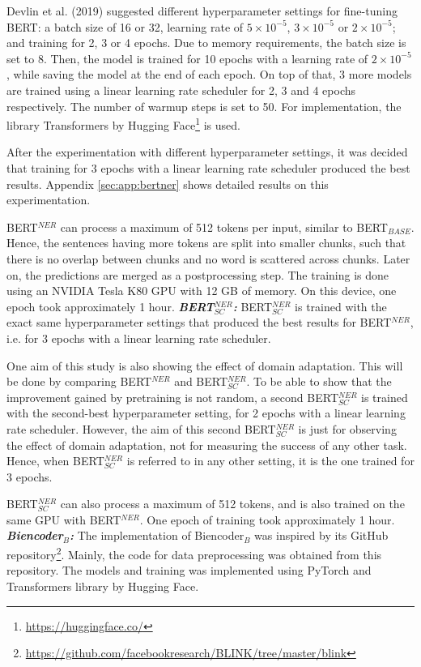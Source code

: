 \documentclass{report}
\theoremstyle{definition}
\theoremstyle{remark}
\begin{document}
Devlin et al. (2019) \cite{BERT} suggested different hyperparameter settings for fine-tuning BERT: a batch size of 16 or 32, learning rate of $5\times10^{-5}$, $3\times10^{-5}$ or $2\times10^{-5}$; and training for 2, 3 or 4 epochs. Due to memory requirements, the batch size is set to 8. Then, the model is trained for 10 epochs with a learning rate of $2\times10^{-5}$, while saving the model at the end of each epoch. On top of that, 3 more models are trained using a linear learning rate scheduler for 2, 3 and 4 epochs respectively. The number of warmup steps is set to 50. For implementation, the library Transformers \cite{huggingface} by Hugging Face\footnote{\url{https://huggingface.co/}} is used.

After the experimentation with different hyperparameter settings, it was decided that training for 3 epochs with a linear learning rate scheduler produced the best results. Appendix \ref{sec:app:bertner} shows detailed results on this experimentation.

BERT$^{NER}$ can process a maximum of 512 tokens per input, similar to BERT$_{BASE}$. Hence, the sentences having more tokens are split into smaller chunks, such that there is no overlap between chunks and no word is scattered across chunks. Later on, the predictions are merged as a postprocessing step. The training is done using an NVIDIA Tesla K80 GPU with 12 GB of memory. On this device, one epoch took approximately 1 hour. 
\newline
\newline
\textit{\textbf{BERT}}$^{NER}_{SC}$\textit{\textbf{:}} BERT$^{NER}_{SC}$ is trained with the exact same hyperparameter settings that produced the best results for BERT$^{NER}$, i.e. for 3 epochs with a linear learning rate scheduler.

One aim of this study is also showing the effect of domain adaptation. This will be done by comparing BERT$^{NER}$ and BERT$^{NER}_{SC}$. To be able to show that the improvement gained by pretraining is not random, a second BERT$^{NER}_{SC}$ is trained with the second-best hyperparameter setting, for 2 epochs with a linear learning rate scheduler. However, the aim of this second BERT$^{NER}_{SC}$ is just for observing the effect of domain adaptation, not for measuring the success of any other task. Hence, when BERT$^{NER}_{SC}$ is referred to in any other setting, it is the one trained for 3 epochs.

BERT$^{NER}_{SC}$ can also process a maximum of 512 tokens, and is also trained on the same GPU with BERT$^{NER}$. One epoch of training took approximately 1 hour.
\newline
\newline
\textit{\textbf{Biencoder}}$_{B}$\textit{\textbf{:}} The implementation of Biencoder$_{B}$ was inspired by its GitHub repository\footnote{\url{https://github.com/facebookresearch/BLINK/tree/master/blink}}. Mainly, the code for data preprocessing was obtained from this repository. The models and training was implemented using PyTorch \cite{pytorch} and Transformers library by Hugging Face.
\end{document}
